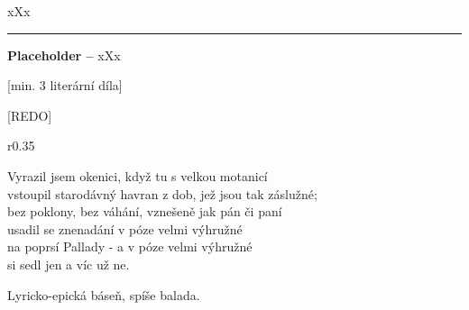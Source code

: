 \documentclass{extarticle} %
\begin{document}





\noindent 
xXx

\vfill

\noindent\begin{minipage}{\textwidth}
    {\textcolor{\wpagecolor}{\rule{\linewidth}{0.4pt}}
    \footnotesize
    \textbf{Placeholder --} xXx
    }
\end{minipage}


\newpage

[min. 3 literární díla]


\changefontsize{7pt}

[REDO]

\noindent\begin{wrapfigure}{r}{0.35\textwidth}
\tiny

\setlength{\parindent}{3pt}
\begin{center}
\noindent
Vyrazil jsem okenici, když tu s velkou motanicí \\
vstoupil starodávný havran z dob, jež jsou tak záslužné; \\
bez poklony, bez váhání, vznešeně jak pán či paní \\
usadil se znenadání v póze velmi výhružné \\
na poprsí Pallady - a v póze velmi výhružné \\
si sedl jen a víc už ne. 
\end{center}
\end{wrapfigure}


\noindent 
Lyricko-epická báseň, spíše balada.



\end{document}
